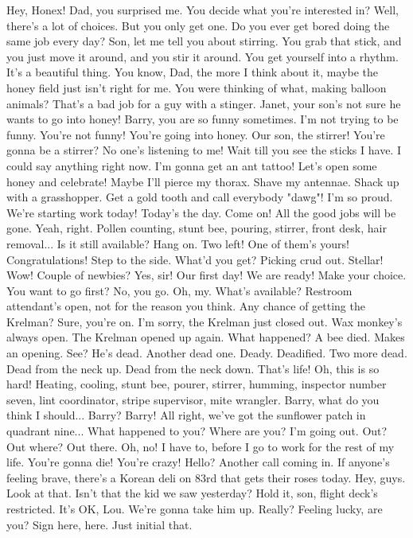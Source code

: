 \documentclass[a4paper,12pt]{article}
\begin{document}
Hey, Honex!
Dad, you surprised me.
You decide what you're interested in?
Well, there's a lot of choices.
But you only get one.
Do you ever get bored doing the same job every day?
Son, let me tell you about stirring.
You grab that stick, and you just move it around, and you stir it around.
You get yourself into a rhythm.
It's a beautiful thing.
You know, Dad, the more I think about it,
maybe the honey field just isn't right for me.
You were thinking of what, making balloon animals?
That's a bad job for a guy with a stinger.
Janet, your son's not sure he wants to go into honey!
Barry, you are so funny sometimes.
I'm not trying to be funny.
You're not funny! You're going into honey. Our son, the stirrer!
You're gonna be a stirrer?
No one's listening to me!
Wait till you see the sticks I have.
I could say anything right now.
I'm gonna get an ant tattoo!
Let's open some honey and celebrate!
Maybe I'll pierce my thorax. Shave my antennae. Shack up with a grasshopper. Get a gold tooth and call everybody "dawg"!
I'm so proud.
We're starting work today!
Today's the day.
Come on! All the good jobs will be gone.
Yeah, right.
Pollen counting, stunt bee, pouring, stirrer, front desk, hair removal...
Is it still available?
Hang on. Two left!
One of them's yours! Congratulations!
Step to the side.
What'd you get?
Picking crud out. Stellar!
Wow!
Couple of newbies?
Yes, sir! Our first day! We are ready!
Make your choice.
You want to go first?
No, you go.
Oh, my. What's available?
Restroom attendant's open, not for the reason you think.
Any chance of getting the Krelman?
Sure, you're on.
I'm sorry, the Krelman just closed out.
Wax monkey's always open.
The Krelman opened up again.
What happened?
A bee died. Makes an opening. See? He's dead. Another dead one.
Deady. Deadified. Two more dead.
Dead from the neck up. Dead from the neck down. That's life!
Oh, this is so hard!
Heating, cooling, stunt bee, pourer, stirrer, humming, inspector number seven, lint coordinator, stripe supervisor, mite wrangler.
Barry, what do you think I should... Barry?
Barry!
All right, we've got the sunflower patch in quadrant nine...
What happened to you?
Where are you?
I'm going out.
Out? Out where?
Out there.
Oh, no!
I have to, before I go to work for the rest of my life.
You're gonna die! You're crazy! Hello?
Another call coming in.
If anyone's feeling brave, there's a Korean deli on 83rd that gets their roses today.
Hey, guys.
Look at that.
Isn't that the kid we saw yesterday?
Hold it, son, flight deck's restricted.
It's OK, Lou. We're gonna take him up.
Really? Feeling lucky, are you?
Sign here, here. Just initial that.
\end{document}
